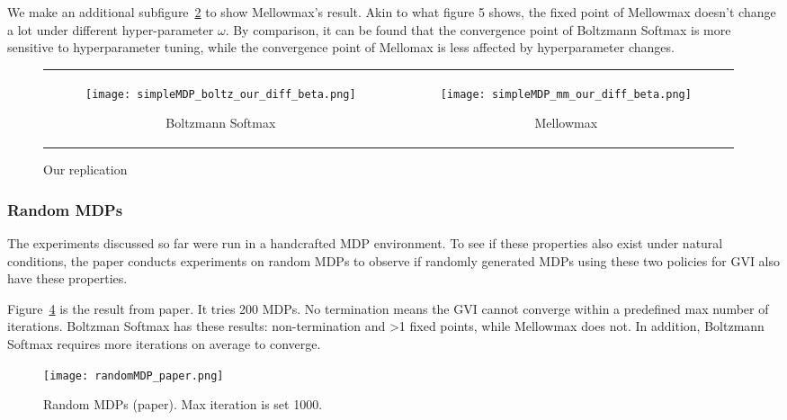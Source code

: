 We make an additional subfigure\ \ref{subfig:our_diff_beta_mm} to show Mellowmax's result. 
Akin to what figure 5 shows, the fixed point of Mellowmax doesn't change a lot under different hyper-parameter $\omega$.
By comparison, it can be found that the convergence point of Boltzmann Softmax is more sensitive to hyperparameter tuning, 
while the convergence point of Mellomax is less affected by hyperparameter changes.

\begin{figure}[H]
\centering
\begin{tabular}{cc}
\begin{subfigure}{0.45\textwidth}\centering\texttt{[image: simpleMDP\_boltz\_our\_diff\_beta.png]}\caption{Boltzmann Softmax}\label{subfig:our_diff_beta_boltz}\end{subfigure}&
\begin{subfigure}{0.45\textwidth}\centering\texttt{[image: simpleMDP\_mm\_our\_diff\_beta.png]}\caption{Mellowmax}\label{subfig:our_diff_beta_mm}\end{subfigure}\\
\end{tabular}
\caption{Our replication}\label{fig:simple_mdp_gvi_our_diff_beta}
\end{figure}



\subsubsection{Random MDPs}

The experiments discussed so far were run in a handcrafted MDP environment. 
To see if these properties also exist under natural conditions, 
the paper conducts experiments on random MDPs to observe if 
randomly generated MDPs using these two policies for GVI also have these properties.

Figure\ \ref{fig:randomMDP_paper} is the result from paper. 
It tries 200 MDPs. No termination means the GVI cannot converge within a predefined max number
of iterations. Boltzman Softmax has these results: non-termination and >1 fixed points, 
while Mellowmax does not. In addition, Boltzmann Softmax requires more iterations on average to converge.

\begin{figure}[H]
    \centering
    \texttt{[image: randomMDP\_paper.png]}
    \caption{Random MDPs (paper). Max iteration is set 1000.}\label{fig:randomMDP_paper}
\end{figure}

